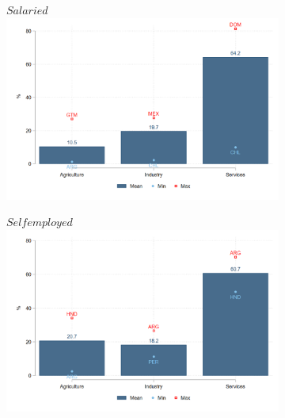\documentclass[english]{article}
\begin{document}
\begin{enumerate}
\begin{figure}[h!tbp]
\begin{subfigure}{.5\textwidth}
  \centering
  \footnotesize{$Salaried$}
  \includegraphics[width=1\textwidth]{latex/figures/Snapshot/Salaried-sector.png}
  \label{fig:salariedsector}
\end{subfigure}%
\begin{subfigure}{.5\textwidth}
  \centering
  \footnotesize{$Self employed$}
\includegraphics[width=1\textwidth]{latex/figures/Snapshot/Self employed-sector.png}
  \label{fig:selfsector}
\end{subfigure}


\end{figure}
\end{enumerate}
\end{document}

